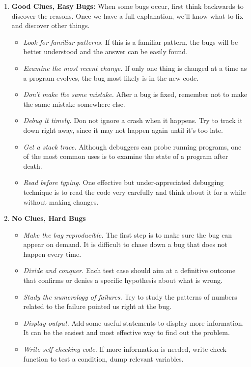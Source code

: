 \documentclass[draftclsnofoot,journal,onecolumn,12pt]{IEEEtran}
\begin{document}
\begin{enumerate}
  \item \textbf{Good Clues, Easy Bugs:} When some bugs occur, first think backwards to discover the reasons. Once we have a full explanation, we'll know what to fix and discover other things.
\begin{itemize}
  \item \textit{Look for familiar patterns.} If this is a familiar pattern, the bugs will be better understood and the answer can be easily found.
  \item \textit{Examine the most recent change.} If only one thing is changed at a time as a program evolves, the bug most likely is in the new code.
  \item \textit{Don't make the same mistake.} After a bug is fixed, remember not to make the same mistake somewhere else.
  \item \textit{Debug it timely.} Don not ignore a crash when it happens. Try to track it down right away, since it may not happen again until it's too late.
  \item \textit{Get a stack trace.} Although debuggers can probe running programs, one of the most common uses is to examine the state of a program after death.
  \item \textit{Read before typing.} One effective but under-appreciated debugging technique is to read the code very carefully and think about it for a while without making changes.
\end{itemize}
  \item \textbf{No Clues, Hard Bugs}
  \begin{itemize}
    \item \textit{Make the bug reproducible.} The first step is to make sure the bug can appear on demand. It is difficult to chase down a bug that does not happen every time.
    \item \textit{Divide and conquer.} Each test case should aim at a definitive outcome that confirms or denies a specific hypothesis about what is wrong.
    \item \textit{Study the numerology of failures.} Try to study the patterns of numbers related to the failure pointed us right at the bug.
    \item \textit{Display output.} Add some useful statements to display more information. It can be the easiest and most effective way to find out the problem.
    \item \textit{Write self-checking code.} If more information is needed, write check function to test a condition, dump relevant variables.

\end{itemize}
\end{enumerate}
\end{document}
